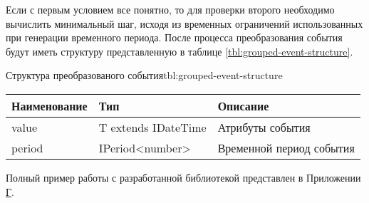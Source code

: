 Если с первым условием все понятно, то для проверки второго необходимо вычислить минимальный шаг, исходя из временных ограничений использованных при генерации временного периода.
После процесса преобразования события будут иметь структуру представленную в таблице \ref{tbl:grouped-event-structure}.

\begin{tblh}{Структура преобразованого события}{tbl:grouped-event-structure}
  \begin{tabularx}{\textwidth}{| p{3cm} | p{4cm} | X |}
    \hline Наименование & Тип                  & Описание                 \\
    \hline value        & T extends IDateTime  & Атрибуты события         \\
    \hline period       & IPeriod<number>      & Временной период события \\
    \hline
    \end{tabularx}
\end{tblh}

Полный пример работы с разработанной библиотекой представлен в Приложении \hyperlink{app:D}{Г}.
